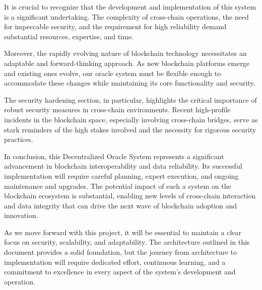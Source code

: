 \documentclass[12pt,a4paper]{article}
\begin{document}
It is crucial to recognize that the development and implementation of this system is a significant undertaking. The complexity of cross-chain operations, the need for impeccable security, and the requirement for high reliability demand substantial resources, expertise, and time. 

Moreover, the rapidly evolving nature of blockchain technology necessitates an adaptable and forward-thinking approach. As new blockchain platforms emerge and existing ones evolve, our oracle system must be flexible enough to accommodate these changes while maintaining its core functionality and security.

The security hardening section, in particular, highlights the critical importance of robust security measures in cross-chain environments. Recent high-profile incidents in the blockchain space, especially involving cross-chain bridges, serve as stark reminders of the high stakes involved and the necessity for rigorous security practices.

In conclusion, this Decentralized Oracle System represents a significant advancement in blockchain interoperability and data reliability. Its successful implementation will require careful planning, expert execution, and ongoing maintenance and upgrades. The potential impact of such a system on the blockchain ecosystem is substantial, enabling new levels of cross-chain interaction and data integrity that can drive the next wave of blockchain adoption and innovation.

As we move forward with this project, it will be essential to maintain a clear focus on security, scalability, and adaptability. The architecture outlined in this document provides a solid foundation, but the journey from architecture to implementation will require dedicated effort, continuous learning, and a commitment to excellence in every aspect of the system's development and operation.
	
\end{document}

